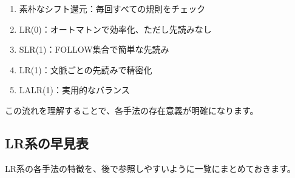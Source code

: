 \begin{enumerate}
\def\labelenumi{\arabic{enumi}.}
\tightlist
\item
  素朴なシフト還元：毎回すべての規則をチェック
\item
  LR(0)：オートマトンで効率化、ただし先読みなし
\item
  SLR(1)：FOLLOW集合で簡単な先読み
\item
  LR(1)：文脈ごとの先読みで精密化
\item
  LALR(1)：実用的なバランス
\end{enumerate}

この流れを理解することで、各手法の存在意義が明確になります。

\hypertarget{chapter5-lrux7cfbux306eux65e9ux898bux8868}{%
\subsection{LR系の早見表}\label{chapter5-lrux7cfbux306eux65e9ux898bux8868}}

LR系の各手法の特徴を、後で参照しやすいように一覧にまとめておきます。

